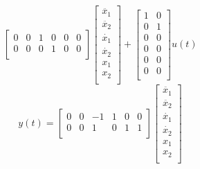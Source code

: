 \documentclass{article}
\begin{document}
\begin{enumerate}[(a)]
$$\begin{bmatrix}
 0 &  0 & 1 & 0 & 0 & 0 \\
 0 &  0 & 0 & 1 & 0 & 0 \\
\end{bmatrix}
\begin{bmatrix}
\ddot{x_1} \\
\ddot{x_2} \\
\dot{x_1} \\
\dot{x_2} \\
x_1 \\
x_2 \\
\end{bmatrix}
+
\begin{bmatrix}
1 & 0  \\
0 & 1  \\
0 & 0  \\
0 & 0  \\
0 & 0  \\
0 & 0  \\
\end{bmatrix}
u(t)
$$
$$
y(t) =
\begin{bmatrix}
0 & 0 & -1 & 1 & 0 & 0 \\
0 & 0 &  1 & 0 & 1 & 1 \\
\end{bmatrix}
\begin{bmatrix}
\ddot{x_1} \\
\ddot{x_2} \\
\dot{x_1} \\
\dot{x_2} \\
x_1 \\
x_2 \\
\end{bmatrix}
$$


\end{enumerate}
\end{document}
